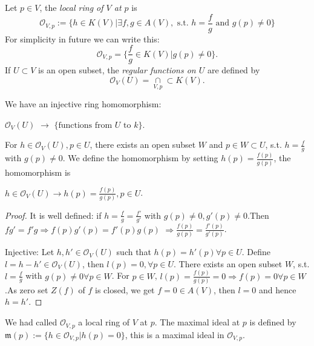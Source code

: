 \begin{definition}
	Let $ p\in V $, the \textit{local ring of $ V $ at $ p $} is
	\begin{equation}
		\mathcal{O}_{V,p}:=\{h \in K(V)|\exists f,g\in A(V), \text{ s.t. } h=\frac{f}{g} \text{ and } g(p)\neq 0 \}
	\end{equation}
	For simplicity in future we can write this:
	\begin{equation}
		\mathcal{O}_{V,p}=\{ \frac{f}{g}\in K(V)|g(p)\neq 0 \}.
	\end{equation}
	If $ U\subset V $ is an open subset, the \textit{regular functions on $ U $} are defined by
	\begin{equation}
		\mathcal{O}_V(U)=\mathop{\cap}\limits_{V,p}\subset K(V).
	\end{equation}
\end{definition}
\begin{proposition}
	We have an injective ring homomorphism:\begin{center}
		$ \mathcal{O}_V(U) $ $ \to $ $ \{ \text{functions from }U \text{ to } k \} $.
	\end{center}
	For $ h\in \mathcal{O}_V(U),p\in U $, there exists an open subset $ W $ and $ p\in W\subset U $, s.t. $ h=\frac{f}{g} $ with $ g(p)\neq 0 $. We define the homomorphism by setting $ h(p)=\frac{f(p)}{g(p)} $, the homomorphism is
	\begin{center}
		$ h\in \mathcal{O}_V(U)\to h(p)=\frac{f(p)}{g(p)}, p\in U $.
	\end{center}
\end{proposition}
\begin{proof}
	It is well defined: if $ h=\frac{f}{g}=\frac{f'}{g'} $ with $ g(p)\neq 0,g'(p)\neq 0 $.Then $ fg'=f'g \Rightarrow f(p)g'(p)=f'(p)g(p)$ $ \Rightarrow \frac{f(p)}{g(p)}=\frac{f'(p)}{g'(p)} $.

	Injective: Let $ h,h'\in \mathcal{O}_V(U) $ such that $ h(p)=h'(p) \forall p\in U$.
	Define $ l=h-h'\in \mathcal{O}_V(U) $, then $ l(p)=0 ,\forall p\in U$. There exists an open subset $ W $, s.t. $ l=\frac{f}{g} $ with $ g(p)\neq 0 \forall p\in W $. For $ p\in W $, $ l(p)=\frac{f(p)}{g(p)}=0\Rightarrow f(p)=0 \forall p\in W $.As zero set $ Z(f) $ of $ f $ is closed, we get $ f=0\in A(V) $, then $ l=0 $ and hence $ h=h' $.
\end{proof}
\begin{definition}
	We had called $ \mathcal{O}_{V,p} $ a local ring of $ V $ at $ p $. The maximal ideal at $ p $ is defined by  $ \mathfrak{m}(p):=\{ h\in \mathcal{O}_{V,p}|h(p)=0 \} $, this is a maximal ideal in $ \mathcal{O}_{V,p} $.
\end{definition}
